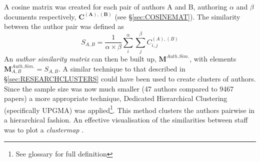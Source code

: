 A cosine matrix was created for each pair of authors A and B, authoring $\alpha$ and $\beta$ documents respectively, $\mathbf{C^{\left( A \right ) , \left( B \right)}}$ (see \S\ref{sec:COSINEMAT}). The similarity between the author pair was defined as 
$$S_{A , B} = \frac{1}{\alpha \times \beta} \sum_{i}^{\alpha} \sum_{j}^{\beta} C^{\left( A \right) , \left( B \right) }_{ i , j }$$
An \emph{author similarity matrix} can then be built up, $\mathbf{M}^{Auth. Sim.}$, with elements $\mathbf{M}^{Auth. Sim.}_{ A , B }=S_{ A , B }$.
A similar technique to that described in  \S\ref{sec:RESEARCHCLUSTERS} could have been used to create clusters of authors. Since the sample size was now much smaller (47 authors compared to 9467 papers) a more appropriate technique, Dedicated Hierarchical Clustering (specifically UPGMA) was applied\cite{heatmapcluster}\footnote{See glossary for full definition}. This method clusters the authors pairwise in a hierarchical fashion.  An effective visualisation of the similarities between staff was to plot a \emph{clustermap} \cite{seaborn}\cite{scipy}.

